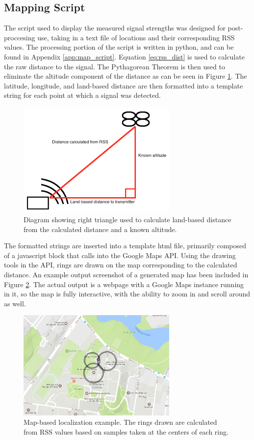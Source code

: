 \subsection{Mapping Script}
The script used to display the measured signal strengths was designed for post-proccesing use, taking in a text file of locations and their corresponding RSS values. The processing portion of the script is written in python, and can be found in Appendix \ref{app:map_script}. Equation \ref{eq:rss_dist} is used to calculate the raw distance to the signal. The Pythagorean Theorem is then used to eliminate the altitude component of the distance as can be seen in Figure \ref{fig:dist_pyth}. The latitude, longitude, and land-based distance are then formatted into a template string for each point at which a signal was detected.\par
\begin{figure}[ht]
\centering
\includegraphics[width=0.70\textwidth]{img/distance_pythag_diagram.png}
\caption{Diagram showing right triangle used to calculate land-based distance from the calculated distance and a known altitude.}
\label{fig:dist_pyth}
\end{figure}
The formatted strings are inserted into a template html file, primarily composed of a javascript block that calls into the Google Maps API. Using the drawing tools in the API, rings are drawn on the map corresponding to the calculated distance. An example output screenshot of a generated map has been included in Figure \ref{fig:map_localize}. The actual output is a webpage with a Google Maps instance running in it, so the map is fully interactive, with the ability to zoom in and scroll around as well.
\begin{figure}[ht]
\centering
\includegraphics[width=0.70\textwidth]{img/localization_map_visualization.png}
\caption{Map-based localization example. The rings drawn are calculated from RSS values based on samples taken at the centers of each ring.}
\label{fig:map_localize}
\end{figure}

